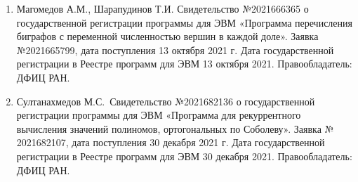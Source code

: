 \begin{enumerate}[1]
    \item
    Магомедов А.М., Шарапудинов Т.И. Свидетельство №2021666365 о государственной регистрации программы для ЭВМ «Программа перечисления биграфов с переменной численностью вершин в каждой доле». Заявка №2021665799, дата поступления 13 октября 2021 г. Дата государственной регистрации в Реестре программ для ЭВМ 13 октября 2021. Правообладатель: ДФИЦ РАН.

    \item
    Султанахмедов М.С.~Свидетельство №2021682136 о государственной регистрации программы для ЭВМ «Программа для рекуррентного вычисления значений полиномов, ортогональных по Соболеву». Заявка № 2021682107, дата поступления 30 декабря 2021 г. Дата государственной регистрации в Реестре программ для ЭВМ 30 декабря 2021. Правообладатель: ДФИЦ РАН.
\end{enumerate}
